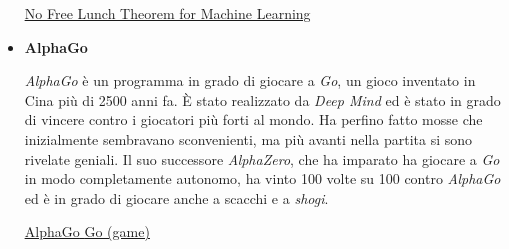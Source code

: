 \documentclass[]{article}
\begin{document}
\begin{itemize}
        \href{https://machinelearningmastery.com/no-free-lunch-theorem-for-machine-learning/}{\underline{No Free Lunch Theorem for Machine Learning}}

    \item \textbf{AlphaGo} \par
        \textit{AlphaGo} è un programma in grado di giocare a \textit{Go}, un gioco inventato in Cina più di 2500 anni fa. È stato realizzato da \textit{Deep Mind} ed è stato in grado di vincere contro i giocatori più forti al mondo. Ha perfino fatto mosse che inizialmente sembravano sconvenienti, ma più avanti nella partita si sono rivelate geniali.
        Il suo successore \textit{AlphaZero}, che ha imparato ha giocare a \textit{Go} in modo completamente autonomo, ha vinto 100 volte su 100 contro \textit{AlphaGo} ed è in grado di giocare anche a scacchi e a \textit{shogi}.

        \href{https://en.wikipedia.org/wiki/AlphaGo}{\underline{AlphaGo} \hspace{1em}}
        \href{https://en.wikipedia.org/wiki/Go_(game)}{\underline{Go (game)}}
\end{itemize}
\end{document}
